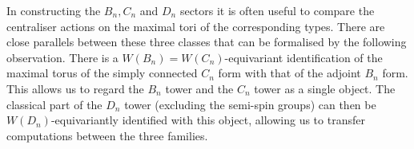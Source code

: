 \documentclass[11pt,a4paper]{article}
\begin{document}
  








\bigskip

In constructing the $B_n, C_n$ and $D_n$ sectors it is often useful to compare the centraliser actions on the maximal tori of the corresponding types.  There are close parallels between these three classes that can be formalised by the following observation.  There is a $W(B_n)=W(C_n)$-equivariant identification of the maximal torus of the simply connected $C_n$ form with that of the adjoint $B_n$ form.  This allows us to regard the $B_n$ tower and the $C_n$ tower as a single object. The classical part of the $D_n$ tower (excluding the semi-spin groups) can then be $W(D_n)$-equivariantly identified with this object, allowing us to transfer computations between the three families.
\end{document}
